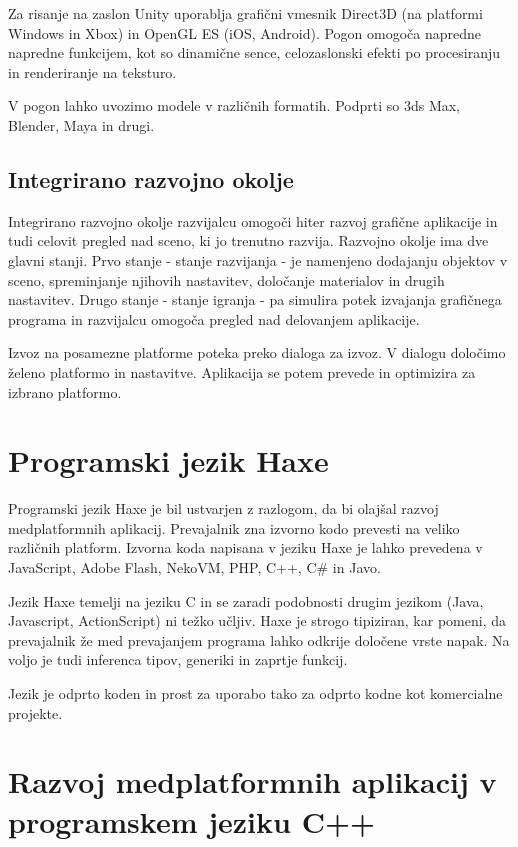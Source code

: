 Za risanje na zaslon Unity uporablja grafični vmesnik Direct3D (na platformi Windows in Xbox) in OpenGL ES (iOS, Android). Pogon omogoča napredne napredne funkcijem, kot so dinamične sence, celozaslonski efekti po procesiranju in renderiranje na teksturo. 

V pogon lahko uvozimo modele v različnih formatih. Podprti so 3ds Max, Blender, Maya in drugi. 

\subsection{Integrirano razvojno okolje} 

Integrirano razvojno okolje razvijalcu omogoči hiter razvoj grafične aplikacije in tudi celovit pregled nad sceno, ki jo trenutno razvija. Razvojno okolje ima dve glavni stanji. Prvo stanje - stanje razvijanja - je namenjeno dodajanju objektov v sceno, spreminjanje njihovih nastavitev, določanje materialov in drugih nastavitev. Drugo stanje - stanje igranja - pa simulira potek izvajanja grafičnega programa in razvijalcu omogoča pregled nad delovanjem aplikacije. 

Izvoz na posamezne platforme poteka preko dialoga za izvoz. V dialogu določimo želeno platformo in nastavitve. Aplikacija se potem prevede in optimizira za izbrano platformo.


\section{Programski jezik Haxe}
\label{sec:haxe}

Programski jezik Haxe \cite{haxe} je bil ustvarjen z razlogom, da bi olajšal razvoj medplatformnih aplikacij. Prevajalnik zna izvorno kodo prevesti na veliko različnih platform. Izvorna koda napisana v jeziku Haxe je lahko prevedena v JavaScript, Adobe Flash, NekoVM, PHP, C++, C\# in Javo.

Jezik Haxe temelji na jeziku C in se zaradi podobnosti drugim jezikom (Java, Javascript, ActionScript) ni težko učljiv. Haxe je strogo tipiziran, kar pomeni, da prevajalnik že med prevajanjem programa lahko odkrije določene vrste napak. Na voljo je tudi inferenca tipov, generiki in zaprtje funkcij. 

Jezik je odprto koden in prost za uporabo tako za odprto kodne kot komercialne projekte.

\section{Razvoj medplatformnih aplikacij v programskem jeziku C++}

